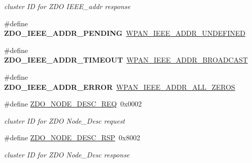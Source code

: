 \begin{DoxyCompactItemize}
\begin{DoxyCompactList}\small\item\em cluster ID for Z\+DO I\+E\+E\+E\+\_\+addr response \end{DoxyCompactList}\item 
\mbox{\label{group__zdo_gabf3af6fc6700372bca9d0bc7117b28bc}} 
\#define {\bfseries Z\+D\+O\+\_\+\+I\+E\+E\+E\+\_\+\+A\+D\+D\+R\+\_\+\+P\+E\+N\+D\+I\+NG}~\hyperlink{group__wpan__types_ga09e965ef6cfbfd48312d86bb011f125b}{W\+P\+A\+N\+\_\+\+I\+E\+E\+E\+\_\+\+A\+D\+D\+R\+\_\+\+U\+N\+D\+E\+F\+I\+N\+ED}
\item 
\mbox{\label{group__zdo_ga69da31cc1a3b48c9053c14fc0dbd2522}} 
\#define {\bfseries Z\+D\+O\+\_\+\+I\+E\+E\+E\+\_\+\+A\+D\+D\+R\+\_\+\+T\+I\+M\+E\+O\+UT}~\hyperlink{group__wpan__types_gaced36f5538c5bb2da4f60a90313f1674}{W\+P\+A\+N\+\_\+\+I\+E\+E\+E\+\_\+\+A\+D\+D\+R\+\_\+\+B\+R\+O\+A\+D\+C\+A\+ST}
\item 
\mbox{\label{group__zdo_ga5e2b6207146eebf6c4787ca3d9448491}} 
\#define {\bfseries Z\+D\+O\+\_\+\+I\+E\+E\+E\+\_\+\+A\+D\+D\+R\+\_\+\+E\+R\+R\+OR}~\hyperlink{group__wpan__types_ga014f9d0857312b6a7f80ee10ecfd0935}{W\+P\+A\+N\+\_\+\+I\+E\+E\+E\+\_\+\+A\+D\+D\+R\+\_\+\+A\+L\+L\+\_\+\+Z\+E\+R\+OS}
\item 
\mbox{\label{group__zdo_ga93263f3bfe644fea4faf6d3a526bcfb8}} 
\#define \hyperlink{group__zdo_ga93263f3bfe644fea4faf6d3a526bcfb8}{Z\+D\+O\+\_\+\+N\+O\+D\+E\+\_\+\+D\+E\+S\+C\+\_\+\+R\+EQ}~0x0002
\begin{DoxyCompactList}\small\item\em cluster ID for Z\+DO Node\+\_\+\+Desc request \end{DoxyCompactList}\item 
\mbox{\label{group__zdo_ga14f5651d9702f40c194e964756256c94}} 
\#define \hyperlink{group__zdo_ga14f5651d9702f40c194e964756256c94}{Z\+D\+O\+\_\+\+N\+O\+D\+E\+\_\+\+D\+E\+S\+C\+\_\+\+R\+SP}~0x8002
\begin{DoxyCompactList}\small\item\em cluster ID for Z\+DO Node\+\_\+\+Desc response \end{DoxyCompactList}\item 
\mbox{\label{group__zdo_gaf67b237d220ee838548a60bf74a2c57b}} 

\end{DoxyCompactItemize}
